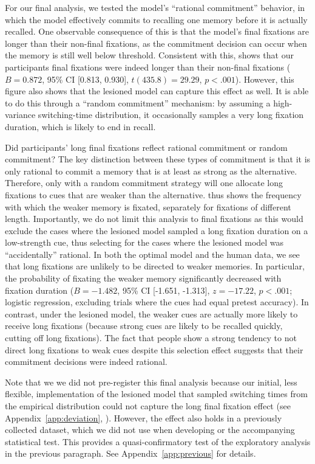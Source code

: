 For our final analysis, we tested the model's ``rational commitment'' behavior, in which the model effectively commits to recalling one memory before it is actually recalled. One observable consequence of this is that the model's final fixations are longer than their non-final fixations, as the commitment decision can occur when the memory is still well below threshold. Consistent with this,  shows that our participants final fixations were indeed longer than their non-final fixations ($B = 0.872$, 95\% CI [0.813, 0.930], $t(435.8)=29.29$, $p < .001$). However, this figure also shows that the lesioned model can capture this effect as well. It is able to do this through a ``random commitment'' mechanism: by assuming a high-variance switching-time distribution, it occasionally samples a very long fixation duration, which is likely to end in recall. 

Did participants' long final fixations reflect rational commitment or random commitment? The key distinction between these types of commitment is that it is only rational to commit a memory that is at least as strong as the alternative. Therefore, only with a random commitment strategy will one allocate long fixations to cues that are weaker than the alternative.  thus shows the frequency with which the weaker memory is fixated, separately for fixations of different length. Importantly, we do not limit this analysis to final fixations as this would exclude the cases where the lesioned model sampled a long fixation duration on a low-strength cue, thus selecting for the cases where the lesioned model was ``accidentally'' rational. In both the optimal model and the human data, we see that long fixations are unlikely to be directed to weaker memories. In particular, the probability of fixating the weaker memory significantly decreased with fixation duration ($B = -1.482$, 95\% CI [-1.651, -1.313], $z=-17.22$, $p < .001$; logistic regression, excluding trials where the cues had equal pretest accuracy). In contrast, under the lesioned model, the weaker cues are actually more likely to receive long fixations (because strong cues are likely to be recalled quickly, cutting off long fixations). The fact that people show a strong tendency to not direct long fixations to weak cues despite this selection effect suggests that their commitment decisions were indeed rational.

Note that we we did not pre-register this final analysis because our initial, less flexible, implementation of the lesioned model that sampled switching times from the empirical distribution could not capture the long final fixation effect (see Appendix~\ref{app:deviation}, ). However, the effect also holds in a previously collected dataset, which we did not use when developing  or the accompanying statistical test. This provides a quasi-confirmatory test of the exploratory analysis in the previous paragraph. See Appendix~\ref{app:previous} for details.


